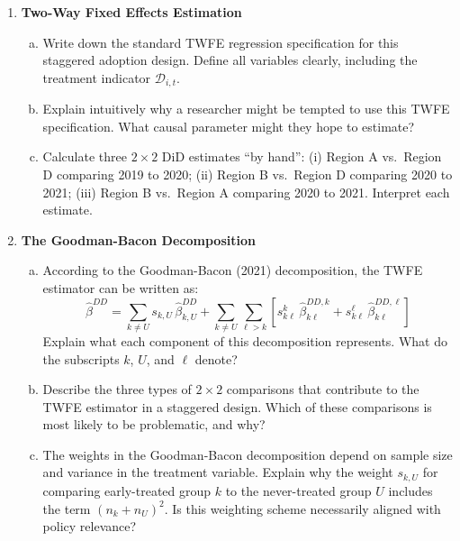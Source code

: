 \documentclass[12pt,a4paper]{article}
\begin{document}
\begin{enumerate}
\item \textbf{Two-Way Fixed Effects Estimation}
\begin{enumerate}[(a)]
\item Write down the standard TWFE regression specification for this staggered adoption design. Define all variables clearly, including the treatment indicator $\mathcal{D}_{i,t}$.
\item Explain intuitively why a researcher might be tempted to use this TWFE specification. What causal parameter might they hope to estimate?
\item Calculate three $2\times2$ DiD estimates ``by hand'': (i) Region A vs.\ Region D comparing 2019 to 2020; (ii) Region B vs.\ Region D comparing 2020 to 2021; (iii) Region B vs.\ Region A comparing 2020 to 2021. Interpret each estimate.
\end{enumerate}

\item \textbf{The Goodman-Bacon Decomposition}
\begin{enumerate}[(a)]
\item According to the Goodman-Bacon (2021) decomposition, the TWFE estimator can be written as:
\begin{equation*}
\hat{\beta}^{DD} = \sum_{k \neq U} s_{k,U}\,\hat{\beta}^{DD}_{k,U} + \sum_{k \neq U}\sum_{\ell > k}\left[ s^{k}_{k\ell}\,\hat{\beta}^{DD,k}_{k\ell} + s^{\ell}_{k\ell}\,\hat{\beta}^{DD,\ell}_{k\ell} \right]
\end{equation*}
Explain what each component of this decomposition represents. What do the subscripts $k$, $U$, and $\ell$ denote?
\item Describe the three types of $2\times2$ comparisons that contribute to the TWFE estimator in a staggered design. Which of these comparisons is most likely to be problematic, and why?
\item The weights in the Goodman-Bacon decomposition depend on sample size and variance in the treatment variable. Explain why the weight $s_{k,U}$ for comparing early-treated group $k$ to the never-treated group $U$ includes the term $(n_k + n_U)^{2}$. Is this weighting scheme necessarily aligned with policy relevance?
\end{enumerate}


\end{enumerate}
\end{document}
